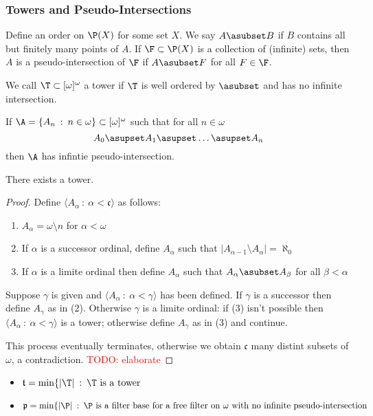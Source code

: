 \documentclass{article}
\begin{document}
\subsubsection{Towers and Pseudo-Intersections}
\begin{defn}
    Define an order on \(\P(X)\) for some set \(X\). We say \(A \asubset B\) if \(B\) contains all but finitely many points of \(A\). If \(\F \subset \P(X)\) is a collection of (infinite) sets, then \(A\) is a pseudo-intersection of \(\F\) if \(A \asubset F\) for all \(F \in \F\).
\end{defn}
\begin{defn}
    We call \(\T \subset [\omega]^{\omega}\) a tower if \(\T\) is well ordered by \(\asubset\) and has no infinite intersection.
\end{defn}
\begin{lem}
    If \(\A = \{A_n \: : \: n \in \omega\} \subset [\omega]^{\omega}\) such that for all \(n \in \omega\)
    \[
        A_0 \asupset  A_1 \asupset \dots \asupset  A_n
    \]
    then \(\A\) has infintie pseudo-intersection.
\end{lem}
\begin{thm}
    There exists a tower.
\end{thm}
\begin{proof}
    Define \(\langle A_{\alpha} \: : \: \alpha < \mathfrak{c}\rangle\) as follows: 
    \begin{enumerate}
        \item \(A_{\alpha} = \omega \setminus n\) for \(\alpha < \omega\)
        \item If \(\alpha\) is a successor ordinal, define \(A_{\alpha}\) such that \(|A_{\alpha - 1}\setminus A_{\alpha}| =\aleph_0\)
        \item If \(\alpha\) is a limite ordinal then define \(A_{\alpha}\) such that \(A_{\alpha} \asubset A_{\beta}\) for all \(\beta < \alpha\)
    \end{enumerate}
    Suppose \(\gamma\) is given and \(\langle A_{\alpha} \: : \: \alpha < \gamma \rangle\) has been defined. If \(\gamma\) is a successor then define \(A_{\gamma}\) as in (2). Otherwise \(\gamma\) is a limite ordinal: if (3) isn't possible then \(\langle A_{\alpha} \: : \: \alpha < \gamma \rangle\) is a tower; otherwise define \(A_{\gamma}\) as in (3) and continue. 

    This process eventually terminates, otherwise we obtain \(\mathfrak{c}\) many distint subsets of \(\omega\), a contradiction. \textcolor{red}{TODO: elaborate}
\end{proof}
\begin{defn}
    \leavevmode
    \begin{itemize}
        \item \(\mathfrak{t} = \min\{|\T| \: : \: \T \text{ is a tower}\)
        \item \(\mathfrak{p} = \min\{|\P| \: : \: \P \text{ is a filter base for a free filter on } \omega \text{ with no infinite pseudo-intersection}\)
    \end{itemize}
\end{defn}
\end{document}
